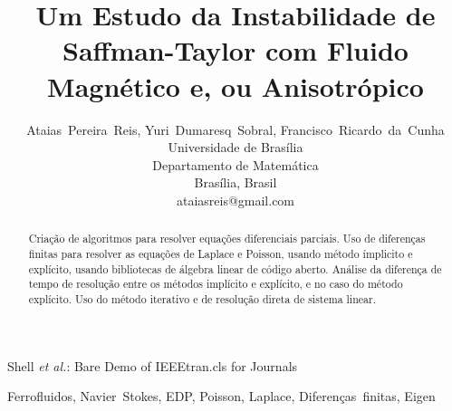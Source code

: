 \documentclass[journal]{IEEEtran}
\begin{document}
\title{Um Estudo da Instabilidade de Saffman-Taylor com Fluido Magnético e, ou Anisotrópico}


\author{Ataias~Pereira~Reis, Yuri~Dumaresq~Sobral, Francisco~Ricardo~da~Cunha\\Universidade de Brasília\\Departamento de Matemática\\Brasília, Brasil\\ataiasreis@gmail.com}

%
{Shell \MakeLowercase{\textit{et al.}}: Bare Demo of IEEEtran.cls for Journals}

\maketitle


\begin{abstract}
Criação de algoritmos para resolver equações diferenciais parciais. Uso de diferenças finitas para resolver as equações de Laplace e Poisson, usando método ímplicito e explícito, usando bibliotecas de álgebra linear de código aberto. Análise da diferença de tempo de resolução entre os métodos implícito e explícito, e no caso do método explícito. Uso do método iterativo e de resolução direta de sistema linear. 
\end{abstract}

\begin{IEEEkeywords}
Ferrofluidos, Navier~Stokes, EDP, Poisson, Laplace, Diferenças~finitas, Eigen
\end{IEEEkeywords}

%
\IEEEpeerreviewmaketitle
\end{document}
